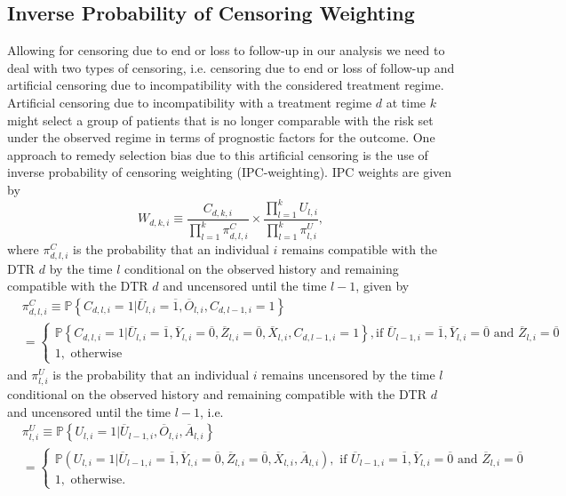 \documentclass[12pt]{article}
\begin{document}
\subsection{Inverse Probability of Censoring Weighting}

Allowing for censoring due to end or loss to follow-up in our analysis we need to deal with two types of censoring, i.e. censoring due to end or loss of follow-up and artificial censoring due to incompatibility with the considered treatment regime. Artificial censoring due to incompatibility with a treatment regime $d$ at time $k$ might select a group of patients that is no longer comparable with the risk set under the observed regime in terms of prognostic factors for the outcome. One approach to remedy selection bias due to this artificial censoring is the use of inverse probability of censoring weighting (IPC-weighting). IPC weights are given by
\begin{equation*}
W_{d,k,i} \equiv \frac{C_{d,k,i}}{ \prod_{l=1}^k \pi^C_{d,l,i}} \times \frac{\prod_{l=1}^{k} U_{l,i}}{ \prod_{l=1}^k \pi^U_{l,i}},
\end{equation*}
where $\pi^C_{d,l,i}$ is the probability that an individual $i$ remains compatible with the DTR $d$ by the time $l$ conditional on the observed history and remaining compatible with the DTR $d$ and uncensored until the time $l-1$, given by 
\begin{align} \label{eqnA2}
&\pi^C_{d,l,i} \equiv \mathbb{P} \left\lbrace C_{d,l,i} = 1 \vert \overline{U}_{l,i} = \overline{1}, \overline{O}_{l,i}, C_{d,l-1,i} = 1 \right\rbrace \\
\nonumber
&=
\begin{cases}
\mathbb{P} \left\lbrace C_{d,l,i} = 1 \vert \overline{U}_{l,i} = \overline{1},  \overline{Y}_{l,i} = \overline{0}, \overline{Z}_{l,i} = \overline{0}, \overline{X}_{l,i},  C_{d,l-1,i} = 1 \right\rbrace, \text{if } \overline{U}_{l-1,i} = \overline{1},  \overline{Y}_{l,i} = \overline{0} \text{ and } \overline{Z}_{l,i} = \overline{0} \\
1, \text{ otherwise}
\end{cases}
\end{align}
and $\pi^U_{l,i}$ is the probability that an individual $i$ remains uncensored by the time $l$ conditional on the observed history and remaining compatible with the DTR $d$ and uncensored until the time $l-1$, i.e.
\begin{align*} 
\nonumber
&\pi^U_{l,i} \equiv \mathbb{P} \left\lbrace U_{l,i} = 1 \vert \overline{U}_{l-1,i}, \overline{O}_{l,i}, \overline{A}_{l,i} \right\rbrace \\
&= 
\begin{cases}
\mathbb{P} \left( U_{l,i} = 1 \vert \overline{U}_{l-1,i} = \overline{1}, \overline{Y}_{l,i} = \overline{0}, \overline{Z}_{l,i} = \overline{0}, \overline{X}_{l,i}, \overline{A}_{l,i} \right),\text{ if } \overline{U}_{l-1,i} = \overline{1},  \overline{Y}_{l,i} = \overline{0} \text{ and } \overline{Z}_{l,i} = \overline{0} \\
1,\text{ otherwise.}
\end{cases}
\end{align*}
\end{document}
